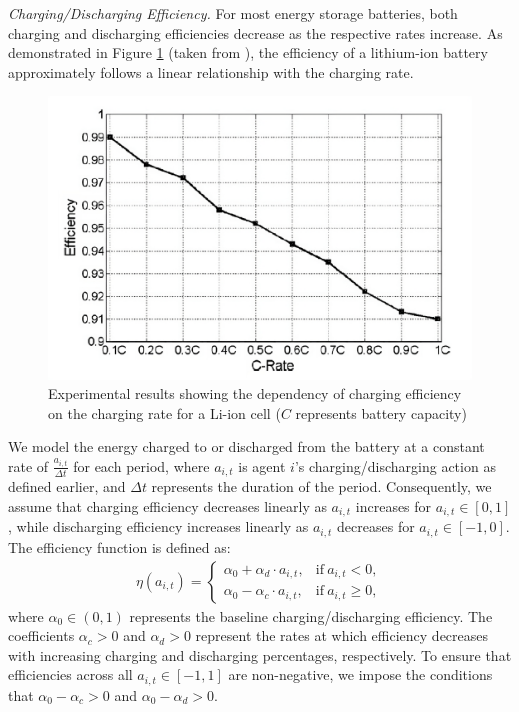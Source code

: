 \documentclass{article}
\theoremstyle{definition}
\theoremstyle{plain}
\begin{document}
\textit{Charging/Discharging Efficiency.} For most energy storage batteries, both charging and discharging efficiencies decrease as the respective rates increase. As demonstrated in Figure \ref{fig:efficiency} (taken from \citep{amoroso2012advantages}), the efficiency of a lithium-ion battery approximately follows a linear relationship with the charging rate.
\begin{figure}[htb]
	\centering
	\includegraphics[scale=0.3]{efficiency.png}
	\caption{Experimental results showing the dependency of charging efficiency on the charging rate for a Li-ion cell ($C$ represents battery capacity)\cite{amoroso2012advantages}}  \label{fig:efficiency}
\end{figure}
We model the energy charged to or discharged from the battery at a constant rate of $\frac{a_{i,t}}{\Delta t}$ for each period, where $a_{i,t}$ is agent $i$'s charging/discharging action as defined earlier, and $\Delta t$ represents the duration of the period. Consequently, we assume that charging efficiency decreases linearly as \( a_{i,t} \) increases for \( a_{i,t} \in [0,1] \), while discharging efficiency increases linearly as \( a_{i,t} \) decreases for \( a_{i,t} \in [-1,0] \).
 The efficiency function is defined as:
\begin{align}
\eta(a_{i,t}) =\begin{cases}
\alpha_0 + \alpha_d \cdot a_{i,t}, & \text{if} \ a_{i,t} < 0, \\
\alpha_0 - \alpha_c \cdot a_{i,t}, & \text{if} \ a_{i,t} \geq 0, 
\end{cases}
\label{eq:eff}
\end{align}
where $\alpha_0 \in (0,1)$ represents the baseline charging/discharging efficiency. The coefficients $\alpha_c > 0$ and $\alpha_d > 0$ represent the rates at which efficiency decreases with increasing charging and discharging percentages, respectively. To ensure that efficiencies across all $a_{i,t} \in [-1,1]$ are non-negative, we impose the conditions that $\alpha_0 - \alpha_c > 0$ and $\alpha_0 - \alpha_d > 0$.
\end{document}
